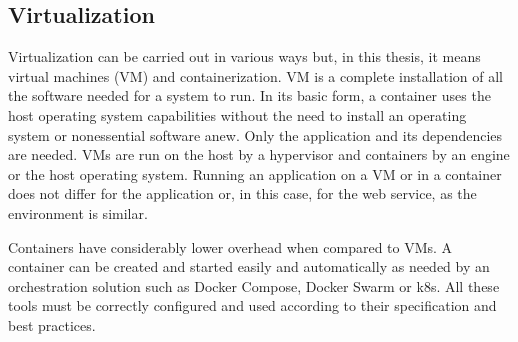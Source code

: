 \subsection{Virtualization}
\begin{sloppypar}
    Virtualization can be carried out in various ways but, in this thesis, it
    means virtual machines (VM) and containerization. VM is a complete
    installation of all the software needed for a system to run. In its basic
    form, a container uses the host operating system capabilities without the
    need to install an operating system or nonessential software anew. Only the
    application and its dependencies are needed. VMs are run on the host by a
    hypervisor and containers by an engine or the host operating system. Running
    an application on a VM or in a container does not differ for the application
    or, in this case, for the web service, as the environment is similar.
\end{sloppypar}
\begin{sloppypar}
    Containers have considerably lower overhead when compared to VMs. A
    container can be created and started easily and automatically as needed by
    an orchestration solution such as Docker Compose, Docker Swarm or k8s. All
    these tools must be correctly configured and used according to their
    specification and best practices.
\end{sloppypar}

